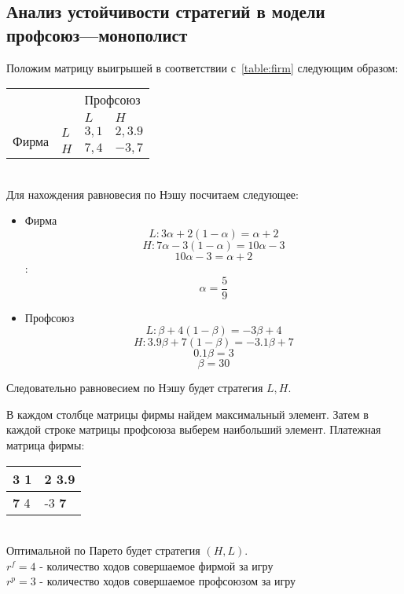 \subsection{Анализ устойчивости стратегий в модели профсоюз---монополист}
Положим матрицу выигрышей в соответствии с~\ref{table:firm} следующим образом:
\begin{table}[h]
	
	\centering
	\begin{tabular}{|l|l|l|l|}
		\hline
		\multicolumn{2}{|l|}{\multirow{2}{*}{}} & \multicolumn{2}{l|}{Профсоюз} \\ \cline{3-4} 
		\multicolumn{2}{|l|}{}                  & $L$            & $H$            \\ \hline
		\multirow{2}{*}{Фирма}     & $L$     & $3, 1$          & $2, 3.9$          \\ \cline{2-4} 
		& $H$     & $7, 4$          & $-3, 7$          \\ \hline
	\end{tabular}
	
\end{table}\\
Для нахождения равновесия по Нэшу посчитаем следующее: 
\begin{itemize}
\item Фирма
	$$ L:  3\alpha + 2(1-\alpha)=\alpha + 2$$
	$$ H: 7\alpha - 3(1-\alpha)=10\alpha - 3$$
	$$10\alpha - 3 = \alpha+2 $$:
	$$\alpha = \frac{5}{9} $$
\item Профсоюз	
	 $$L: \beta + 4(1-\beta)=-3\beta + 4$$
	 $$H: 3.9\beta + 7(1-\beta)=-3.1\beta +7$$
	$$0.1\beta  = 3 $$
	$$\beta = 30 $$
	
	
\end{itemize}

Следовательно равновесием по Нэшу будет стратегия $L,H$.

В каждом столбце матрицы фирмы найдем максимальный элемент. 
Затем в каждой строке матрицы профсоюза выберем наибольший элемент.
Платежная матрица фирмы:\\
\begin{table}[h]
	\centering
	\begin{tabular}{|l|l|}
		\hline
		3 1 & \textbf{2 3.9}  \\ \hline
		\textbf{7} 4 & -3 \textbf{7} \\ \hline
	\end{tabular}
\end{table}\\
Оптимальной по Парето будет стратегия $(H,L)$.\\
$r^f= 4 $ - количество ходов совершаемое фирмой за игру\\
$r^p= 3 $ - количество ходов совершаемое профсоюзом за игру\\ \\


